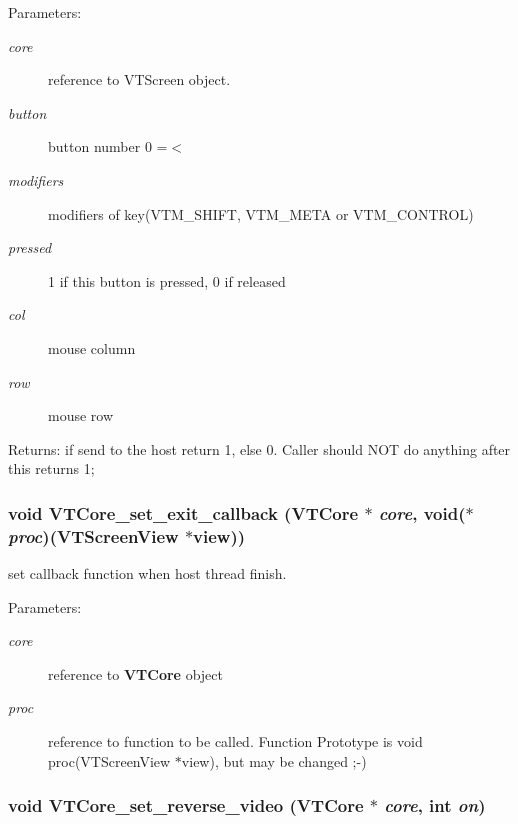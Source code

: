\begin{Desc}
\item[Parameters:]
\begin{description}
\item[{\em core}]reference to VTScreen object. \item[{\em button}]button number 0 =$<$ \item[{\em modifiers}]modifiers of key(VTM\_\-SHIFT, VTM\_\-META or VTM\_\-CONTROL) \item[{\em pressed}]1 if this button is pressed, 0 if released \item[{\em col}]mouse column \item[{\em row}]mouse row \end{description}
\end{Desc}
\begin{Desc}
\item[Returns:]if send to the host return 1, else 0. Caller should NOT do anything after this returns 1; \end{Desc}
\subsubsection{\setlength{\rightskip}{0pt plus 5cm}void VTCore\_\-set\_\-exit\_\-callback ({\bf VTCore} $\ast$ {\em core}, void($\ast$ {\em proc})({\bf VTScreen\-View} $\ast$view))}\label{core_8h_a58}


set callback function when host thread finish.

\begin{Desc}
\item[Parameters:]
\begin{description}
\item[{\em core}]reference to {\bf VTCore} object \item[{\em proc}]reference to function to be called. Function Prototype is void proc(VTScreen\-View $\ast$view), but may be changed ;-) \end{description}
\end{Desc}
\subsubsection{\setlength{\rightskip}{0pt plus 5cm}void VTCore\_\-set\_\-reverse\_\-video ({\bf VTCore} $\ast$ {\em core}, int {\em on})}\label{core_8h_a59}


